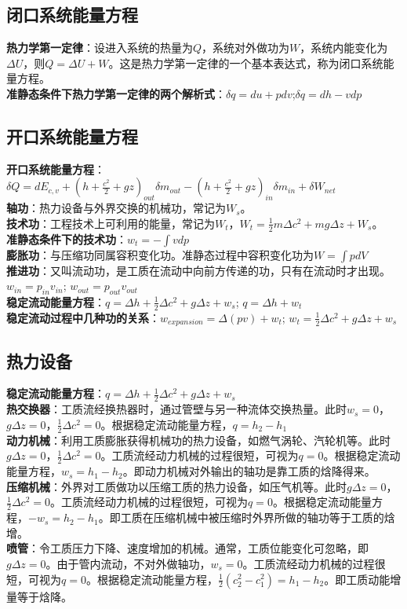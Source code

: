 \documentclass[a4paper,9pt]{ctexart}
\begin{document}
\subsection{闭口系统能量方程}
\noindent
\textbf{热力学第一定律}：设进入系统的热量为$Q$，系统对外做功为$W$，系统内能变化为$\Delta U$，则$Q=\Delta U+W$。这是热力学第一定律的一个基本表达式，称为闭口系统能量方程。\\
\textbf{准静态条件下热力学第一定律的两个解析式}：$\delta q=du+pdv$;$\delta q=dh-vdp$

\subsection{开口系统能量方程}
\noindent
\textbf{开口系统能量方程}：$\delta Q=dE_{c,v}+(h+\frac{c^2}{2}+gz)_{out}\delta m_{out}-(h+\frac{c^2}{2}+gz)_{in}\delta m_{in}+\delta W_{net}$\\
\textbf{轴功}：热力设备与外界交换的机械功，常记为$W_s$。\\
\textbf{技术功}：工程技术上可利用的能量，常记为$W_t$，$W_t=\frac{1}{2}m\Delta c^2+mg\Delta z+W_s$。\\
\textbf{准静态条件下的技术功}：$w_t=-\int vdp$\\
\textbf{膨胀功}：与压缩功同属容积变化功。准静态过程中容积变化功为$W=\int pdV$\\
\textbf{推进功}：又叫流动功，是工质在流动中向前方传递的功，只有在流动时才出现。$w_{in}=p_{in}v_{in}$; $w_{out}=p_{out}v_{out}$\\
\textbf{稳定流动能量方程}：$q=\Delta h+\frac{1}{2}\Delta c^2+g\Delta z+w_{s}$; $q=\Delta h+w_t$\\
\textbf{稳定流动过程中几种功的关系}：$w_{expansion}=\Delta(pv)+w_t$; $w_t=\frac{1}{2}\Delta c^2+g\Delta z+w_s$

\subsection{热力设备}
\noindent
\textbf{稳定流动能量方程}：$q=\Delta h+\frac{1}{2}\Delta c^2+g\Delta z+w_{s}$\\
\textbf{热交换器}：工质流经换热器时，通过管壁与另一种流体交换热量。此时$w_s=0$，$g\Delta z=0$，$\frac{1}{2}\Delta c^2=0$。根据稳定流动能量方程，$q=h_2-h_1$\\
\textbf{动力机械}：利用工质膨胀获得机械功的热力设备，如燃气涡轮、汽轮机等。此时$g\Delta z=0$，$\frac{1}{2}\Delta c^2=0$。工质流经动力机械的过程很短，可视为$q=0$。根据稳定流动能量方程，$w_s=h_1-h_2$。即动力机械对外输出的轴功是靠工质的焓降得来。\\
\textbf{压缩机械}：外界对工质做功以压缩工质的热力设备，如压气机等。此时$g\Delta z=0$，$\frac{1}{2}\Delta c^2=0$。工质流经动力机械的过程很短，可视为$q=0$。根据稳定流动能量方程，$-w_s=h_2-h_1$。即工质在压缩机械中被压缩时外界所做的轴功等于工质的焓增。\\
\textbf{喷管}：令工质压力下降、速度增加的机械。通常，工质位能变化可忽略，即$g\Delta z=0$。由于管内流动，不对外做轴功，$w_s=0$。工质流经动力机械的过程很短，可视为$q=0$。根据稳定流动能量方程，$\frac{1}{2}(c_2^2-c_1^2)=h_1-h_2$。即工质动能增量等于焓降。
\end{document}
